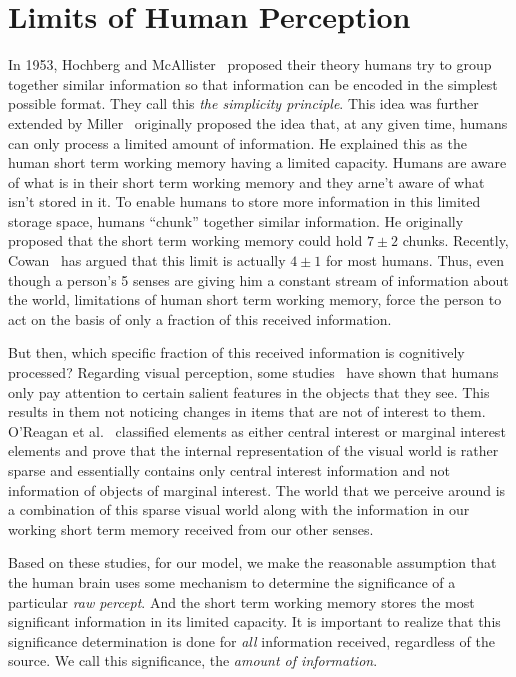 \section{Limits of Human Perception}
\label{IBP:ReviewPerception}
In 1953, Hochberg and McAllister~\cite{Hochberg:1953eh} proposed their theory humans try to group together similar information so that information can be encoded in the simplest possible format. They call this \emph{the simplicity principle}. This idea was further extended by Miller~\cite{Miller:1956tr} originally proposed the idea that, at any given time, humans can only process a limited amount of information. He explained this as the human short term working memory having a limited capacity. Humans are aware of what is in their short term working memory and they arne't aware of what isn't stored in it. To enable humans to store more information in this limited storage space, humans ``chunk'' together similar information. He originally proposed that the short term working memory could hold $7\pm 2$ chunks. Recently, Cowan~\cite{Cowan:2001wi} has argued that this limit is actually $4\pm 1$ for most humans. Thus, even though a person's 5 senses are giving him a constant stream of information about the world, limitations of human short term working memory, force the person to act on the basis of only a fraction of this received information.

But then, which specific fraction of this received information is cognitively processed? Regarding visual perception, some studies~\cite{Itti:2001wa,OReagan:1999wj,Triesch:2003vz} have shown that humans only pay attention to certain salient features in the objects that they see. This results in them not noticing changes in items that are not of interest to them. O'Reagan et al.~\cite{OReagan:1999wj} classified elements as either central interest or marginal interest elements and prove that the internal representation of the visual world is rather sparse and essentially contains only central interest information and not information of objects of marginal interest. The world that we perceive around is a combination of this sparse visual world along with the information in our working short term memory received from our other senses.

Based on these studies, for our model, we make the reasonable assumption that the human brain uses some mechanism to determine the significance of a particular \emph{raw percept}. And the short term working memory stores the most significant information in its limited capacity. It is important to realize that this significance determination is done for \emph{all} information received, regardless of the source. We call this significance, the \emph{amount of information}.

